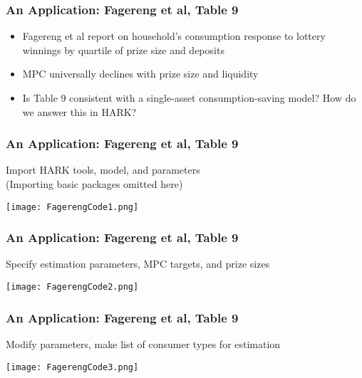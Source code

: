 \documentclass[11ptt]{beamer}
\begin{document}
\begin{frame}\label{Fagereng}
\frametitle{An Application: Fagereng et al, Table 9}

\begin{itemize}
\item Fagereng et al report on household's consumption response to lottery winnings by quartile of prize size and deposits

\item MPC universally declines with prize size and liquidity

\item Is Table 9 consistent with a single-asset consumption-saving model?  How do we answer this in HARK?

\end{itemize}
\end{frame}



\begin{frame}
\frametitle{An Application: Fagereng et al, Table 9}

Import HARK tools, model, and parameters\\
(Importing basic packages omitted here)
\begin{center}
\texttt{[image: FagerengCode1.png]}
\end{center}

\end{frame}



\begin{frame}
\frametitle{An Application: Fagereng et al, Table 9}

Specify estimation parameters, MPC targets, and prize sizes
\begin{center}
\texttt{[image: FagerengCode2.png]}
\end{center}

\end{frame}



\begin{frame}
\frametitle{An Application: Fagereng et al, Table 9}

Modify parameters, make list of consumer types for estimation
\begin{center}
\texttt{[image: FagerengCode3.png]}
\end{center}

\end{frame}
\end{document}
